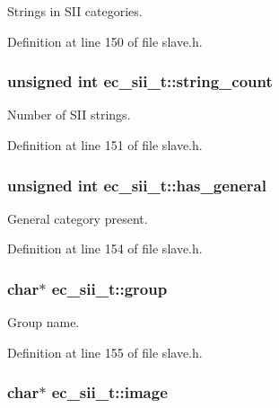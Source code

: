 \-Strings in \-S\-I\-I categories. 



\-Definition at line 150 of file slave.\-h.

\subsubsection[{string\-\_\-count}]{\setlength{\rightskip}{0pt plus 5cm}unsigned int {\bf ec\-\_\-sii\-\_\-t\-::string\-\_\-count}}\label{structec__sii__t_a4bfc0157c4dfaad31b7330aa5f515c5a}


\-Number of \-S\-I\-I strings. 



\-Definition at line 151 of file slave.\-h.

\subsubsection[{has\-\_\-general}]{\setlength{\rightskip}{0pt plus 5cm}unsigned int {\bf ec\-\_\-sii\-\_\-t\-::has\-\_\-general}}\label{structec__sii__t_ac9a082bcb14f1d40aa7a2ee278a4a912}


\-General category present. 



\-Definition at line 154 of file slave.\-h.

\subsubsection[{group}]{\setlength{\rightskip}{0pt plus 5cm}char$\ast$ {\bf ec\-\_\-sii\-\_\-t\-::group}}\label{structec__sii__t_a0ac2c5757ef583a6b3e8a8c0ddffbd9f}


\-Group name. 



\-Definition at line 155 of file slave.\-h.

\subsubsection[{image}]{\setlength{\rightskip}{0pt plus 5cm}char$\ast$ {\bf ec\-\_\-sii\-\_\-t\-::image}}\label{structec__sii__t_a505df193133b999f2c073260648b5359}


